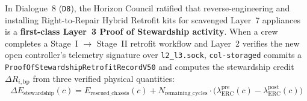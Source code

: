 In Dialogue~8 (\texttt{D8}), the Horizon Council ratified that reverse-engineering and installing Right-to-Repair Hybrid Retrofit kits for scavenged Layer~7 appliances is a \textbf{first-class Layer~3 Proof of Stewardship activity}. When a crew completes a Stage~I $\to$ Stage~II retrofit workflow and Layer~2 verifies the new open controller's telemetry signature over \texttt{l2\_l3.sock}, \texttt{col-storaged} commits a \texttt{ProofOfStewardshipRetrofitRecordV50} and computes the stewardship credit $\Delta R_{i,\mathrm{bp}}$ from three verified physical quantities:
\begin{equation}
\Delta E_{\mathrm{stewardship}}(c) = E_{\mathrm{rescued\_chassis}}(c) + N_{\mathrm{remaining\_cycles}} \cdot \bigl(\lambda_{\mathrm{ERC}}^{\mathrm{pre}}(c) - \lambda_{\mathrm{ERC}}^{\mathrm{post}}(c)\bigr)
\label{eq:ch6-retrofit-exergy-saved}
\end{equation}


